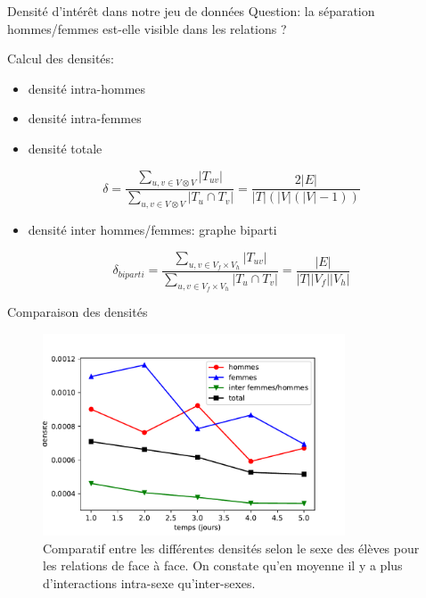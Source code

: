 \documentclass[15pt]{beamer}
\begin{document}
\begin{frame}{Densité d'intérêt dans notre jeu de données}
    Question: la séparation hommes/femmes est-elle \og visible \fg{} dans les relations ?
    
    Calcul des densités:
    \begin{itemize}
        \item densité intra-hommes
        \item densité intra-femmes
        \item densité totale
    \end{itemize}
    $$\delta = \frac{\sum_{u,v \in V\otimes V} |T_{uv}|}{\sum_{u,v \in V \otimes V}|T_u\cap T_v|} = \frac{2|E|}{|T|(|V|(|V|-1))}$$
    \begin{itemize}
        \item densité inter hommes/femmes: graphe biparti
    \end{itemize}
    $$\delta_{biparti}=\frac{\sum_{u,v \in V_f \times V_h} |T_{uv}|}{\sum_{u,v \in V_f \times V_h}|T_u\cap T_v|}=\frac{|E|}{|T||V_f||V_h|}$$
    
\end{frame}

\begin{frame}{Comparaison des densités}
    \begin{figure}
        \centering
        \includegraphics[width=0.8\textwidth]{img/compfg.pdf}
        \caption{Comparatif entre les différentes densités selon le sexe des élèves pour les relations de face à face. On constate qu'en moyenne il y a plus d'interactions intra-sexe qu'inter-sexes.}
        \label{fig:my_label}
    \end{figure}
\end{frame}
    
\end{document}
